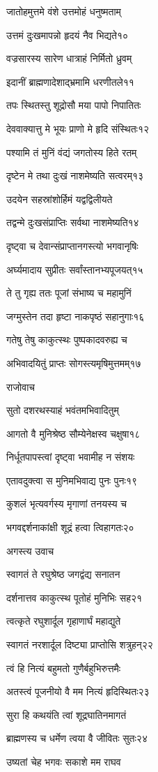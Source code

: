 जातोहमुत्तमे वंशे उत्तमोहं धनुष्मताम्

उत्तमं दुःखमापन्नो हृदयं नैव भिद्यते१०

वज्रसारस्य सारेण धात्राहं निर्मितो ध्रुवम्

इदानीं ब्राह्मणादेशाद्भ्रमामि धरणीतले११

तपः स्थितस्तु शूद्रोसौ मया पापो निपातितः

देववाक्यात्तु मे भूयः प्राणो मे हृदि संस्थितः१२

पश्यामि तं मुनिं वंद्यं जगतोस्य हिते रतम्

दृष्टेन मे तथा दुःखं नाशमेष्यति सत्वरम्१३

उदयेन सहस्रांशोर्हिमं यद्वद्विलीयते

तद्वन्मे दुःखसंप्राप्तिः सर्वथा नाशमेष्यति१४

दृष्ट्वा च देवान्संप्राप्तानगस्त्यो भगवानृषिः

अर्घ्यमादाय सुप्रीतः सर्वांस्तानभ्यपूजयत्१५

ते तु गृह्य ततः पूजां संभाष्य च महामुनिं

जग्मुस्तेन तदा हृष्टा नाकपृष्ठं सहानुगाः१६

गतेषु तेषु काकुत्स्थः पुष्पकादवरुह्य च

अभिवादयितुं प्राप्तः सोगस्त्यमृषिमुत्तमम्१७

राजोवाच

सुतो दशरथस्याहं भवंतमभिवादितुम्

आगतो वै मुनिश्रेष्ठ सौम्येनेक्षस्व चक्षुषा१८

निर्धूतपापस्त्वां दृष्ट्वा भवामीह न संशयः

एतावदुक्त्वा स मुनिमभिवाद्य पुनः पुनः१९

कुशलं भृत्यवर्गस्य मृगाणां तनयस्य च

भगवद्दर्शनाकांक्षी शूद्रं हत्वा त्विहागतः२०

अगस्त्य उवाच

स्वागतं ते रघुश्रेष्ठ जगद्वंद्य सनातन

दर्शनात्तव काकुत्स्थ पूतोहं मुनिभिः सह२१

त्वत्कृते रघुशार्दूल गृहाणार्घं महाद्युते

स्वागतं नरशार्दूल दिष्ट्या प्राप्तोसि शत्रुहन्२२

त्वं हि नित्यं बहुमतो गुणैर्बहुभिरुत्तमैः

अतस्त्वं पूजनीयो वै मम नित्यं हृदिस्थितः२३

सुरा हि कथयंति त्वां शूद्रघातिनमागतं

ब्राह्मणस्य च धर्मेण त्वया वै जीवितः सुतः२४

उष्यतां चेह भगवः सकाशे मम राघव

